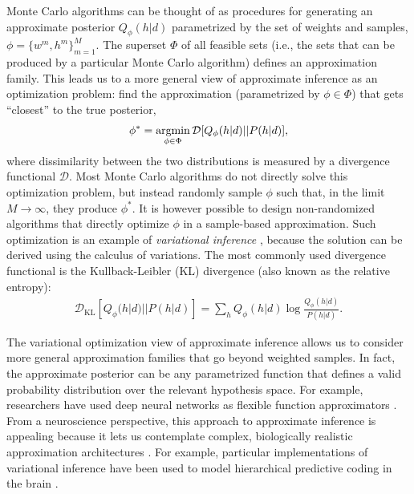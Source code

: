 Monte Carlo algorithms can be thought of as procedures for generating an approximate posterior $Q_\phi(h|d)$ parametrized by the set of weights and samples, $\phi = \{ w^m, h^m \}_{m=1}^M$. The superset $\Phi$ of all feasible sets (i.e., the sets that can be produced by a particular Monte Carlo algorithm) defines an approximation family. This leads us to a more general view of approximate inference as an optimization problem: find the approximation (parametrized by $\phi \in \Phi$) that gets ``closest'' to the true posterior,
\begin{align}
\phi^\ast = \operatorname*{argmin}_{\phi \in \Phi} \mathcal{D}[Q_\phi(h|d)||P(h|d)],
\end{align}
where dissimilarity between the two distributions is measured by a divergence functional $\mathcal{D}$. Most Monte Carlo algorithms do not directly solve this optimization problem, but instead randomly sample $\phi$ such that, in the limit $M \rightarrow \infty$, they produce $\phi^\ast$. It is however possible to design non-randomized algorithms that directly optimize $\phi$ \citep{saeedi2017variational} in a sample-based approximation. Such optimization is an example of \emph{variational inference} \citep{jordan1999introduction}, because the solution can be derived using the calculus of variations. The most commonly used divergence functional is the Kullback-Leibler (KL) divergence (also known as the relative entropy):
\begin{align}
\mathcal{D}_{\text{KL}}[Q_\phi(h|d)||P(h|d)] = \sum_h Q_\phi(h|d) \log \frac{Q_\phi(h|d)}{P(h|d)}.
\end{align}

The variational optimization view of approximate inference allows us to consider more general approximation families that go beyond weighted samples. In fact, the approximate posterior can be any parametrized function that defines a valid probability distribution over the relevant hypothesis space. For example, researchers have used deep neural networks as flexible function approximators \citep{dayan1995helmholtz,kingma2014auto,mnih2014neural,rezende2015variational,paige2016inference}. From a neuroscience perspective, this approach to approximate inference is appealing because it lets us contemplate complex, biologically realistic approximation architectures \citep[provided that the optimization procedures can also be realized biologically; see][]{whittington2019theories}. For example, particular implementations of variational inference have been used to model hierarchical predictive coding in the brain \citep{friston2008hierarchical,gershman2019does}.

